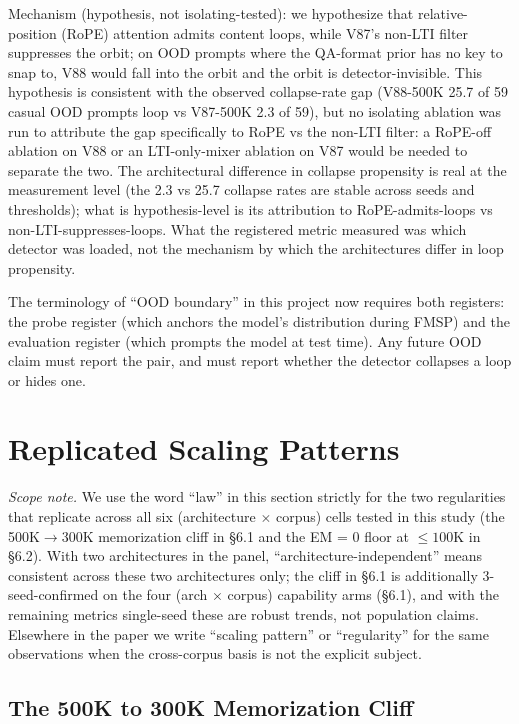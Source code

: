 \documentclass[11pt]{article}
\begin{document}
Mechanism (hypothesis, not isolating-tested): we hypothesize that relative-position (RoPE) attention admits content loops, while V87's non-LTI filter suppresses the orbit; on OOD prompts where the QA-format prior has no key to snap to, V88 would fall into the orbit and the orbit is detector-invisible. This hypothesis is consistent with the observed collapse-rate gap (V88-500K 25.7 of 59 casual OOD prompts loop vs V87-500K 2.3 of 59), but no isolating ablation was run to attribute the gap specifically to RoPE vs the non-LTI filter: a RoPE-off ablation on V88 or an LTI-only-mixer ablation on V87 would be needed to separate the two. The architectural difference in collapse propensity is real at the measurement level (the 2.3 vs 25.7 collapse rates are stable across seeds and thresholds); what is hypothesis-level is its attribution to RoPE-admits-loops vs non-LTI-suppresses-loops. What the registered metric measured was which detector was loaded, not the mechanism by which the architectures differ in loop propensity.

The terminology of ``OOD boundary'' in this project now requires both registers: the probe register (which anchors the model's distribution during FMSP) and the evaluation register (which prompts the model at test time). Any future OOD claim must report the pair, and must report whether the detector collapses a loop or hides one.

\section{Replicated Scaling Patterns}

\emph{Scope note.} We use the word ``law'' in this section strictly for the two regularities that replicate across all six (architecture $\times$ corpus) cells tested in this study (the 500K$\to$300K memorization cliff in \S6.1 and the EM = 0 floor at $\leq 100$K in \S6.2). With two architectures in the panel, ``architecture-independent'' means consistent across these two architectures only; the cliff in \S6.1 is additionally 3-seed-confirmed on the four (arch $\times$ corpus) capability arms (\S6.1), and with the remaining metrics single-seed these are robust trends, not population claims. Elsewhere in the paper we write ``scaling pattern'' or ``regularity'' for the same observations when the cross-corpus basis is not the explicit subject.

\subsection{The 500K to 300K Memorization Cliff}
\end{document}
